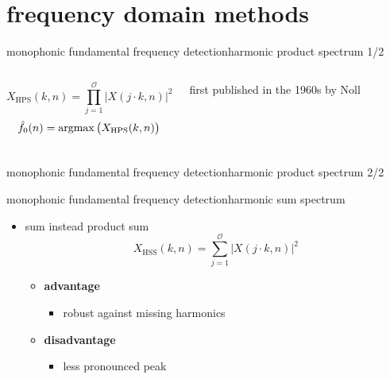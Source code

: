     \section[frequency domain]{frequency domain methods}
	\begin{frame}{monophonic fundamental frequency detection}{harmonic product spectrum 1/2}
        \vspace{-13mm}
        \begin{columns}
                \vspace{4mm}
                \begin{equation*}\label{eq:hps}
                    X_{\mathrm{HPS}}(k,n) = \prod\limits_{j=1}^{\mathcal{O}}{|X(j\cdot k,n)|^2}
                \end{equation*}
                \begin{equation*}\label{eq:hps}
                    \hat{f}_0(n) = \operatorname*{argmax}\big(X_{\mathrm{HPS}}(k,n)\big)
                \end{equation*}
                
                first published in the 1960s by Noll
		\end{columns}
        \vspace{-5mm}
	\end{frame}
	
	\begin{frame}{monophonic fundamental frequency detection}{harmonic product spectrum 2/2}
	\end{frame}
	
	\begin{frame}{monophonic fundamental frequency detection}{harmonic sum spectrum}
        \begin{itemize}
            \item   sum instead product sum
        \begin{equation*}\label{eq:hss}
            X_{\mathrm{HSS}}(k,n) = \sum\limits_{j=1}^{\mathcal{O}}{|X(j\cdot k,n)|^2} 
        \end{equation*}
        \bigskip

                \begin{itemize}
                    \item<1->   \textbf{advantage}
                        \begin{itemize}
                            \item   robust against missing harmonics
                        \end{itemize}
                    \item<1->   \textbf{disadvantage}
                        \begin{itemize}
                            \item   less pronounced peak
                        \end{itemize}
                \end{itemize}
        \end{itemize}
	\end{frame}
	
